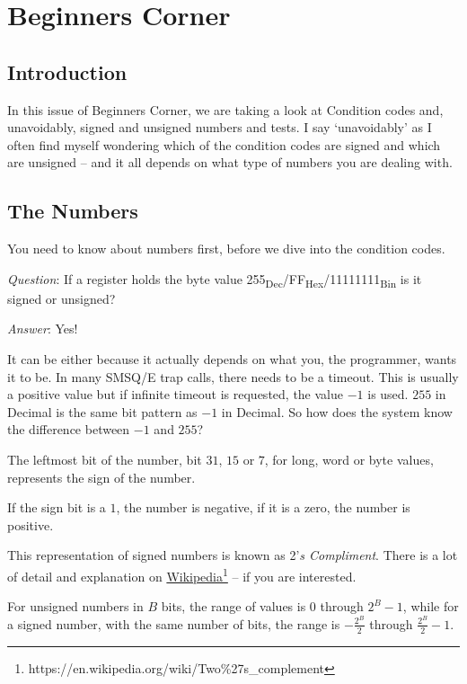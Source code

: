 
\chapter{Beginners Corner}

\section{Introduction}

In this issue of Beginners Corner, we are taking a look at Condition
codes and, unavoidably, signed and unsigned numbers and tests. I say
`unavoidably' as I often find myself wondering which of the condition
codes are signed and which are unsigned -- and it all depends on
what type of numbers you are dealing with.

\section{The Numbers}

You need to know about numbers first, before we dive into the condition
codes. 

\emph{Question}: If a register holds the byte value 255\textsubscript{Dec}/FF\textsubscript{Hex}/11111111\textsubscript{Bin}
is it signed or unsigned?

\emph{Answer}: Yes!

It can be either because it actually depends on what you, the programmer,
wants it to be. In many SMSQ/E trap calls, there needs to be a timeout.
This is usually a positive value but if infinite timeout is requested,
the value $-1$ is used. $255$ in Decimal is the same bit pattern
as $-1$ in Decimal. So how does the system know the difference between
$-1$ and $255$?

The leftmost bit of the number, bit $31$, $15$ or $7$, for long,
word or byte values, represents the sign of the number. 

If the sign bit is a $1$, the number is negative, if it is a zero,
the number is positive. 

This representation of signed numbers is known as 2'\emph{s Compliment}.
There is a lot of detail and explanation on \href{https://en.wikipedia.org/wiki/Two\%27s_complement}{Wikipedia}\footnote{https://en.wikipedia.org/wiki/Two\%27s\_complement}
-- if you are interested. 

For unsigned numbers in $B$ bits, the range of values is $0$ through
$2^{B}-1$, while for a signed number, with the same number of bits,
the range is $-\frac{2^{B}}{2}$ through $\frac{2^{B}}{2}-1$.

